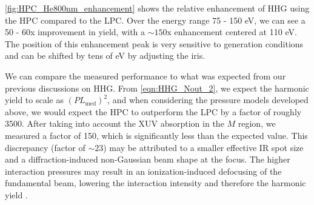 \cref{fig:HPC_He800nm_enhancement} shows the relative enhancement of HHG using the HPC compared to the LPC. Over the energy range 75 - 150 eV, we can see a 50 - 60x improvement in yield, with a $\sim 150 \textrm{x}$ enhancement centered at 110 eV. The position of this enhancement peak is very sensitive to generation conditions and can be shifted by tens of eV by adjusting the iris.

We can compare the measured performance to what was expected from our previous discussions on HHG. From \cref{eqn:HHG_Nout_2}, we expect the harmonic yield to scale as $(PL_{\textrm{med}})^2$, and when considering the pressure models developed above, we would expect the HPC to outperform the LPC by a factor of roughly 3500. After taking into account the XUV absorption in the $M$ region, we measured a factor of 150, which is significantly less than the expected value. This discrepancy (factor of $\sim 23$) may be attributed to a smaller effective IR spot size and a diffraction-induced non-Gaussian beam shape at the focus. The higher interaction pressures may result in an ionization-induced defocusing of the fundamental beam, lowering the interaction intensity and therefore the harmonic yield \cite{altucciInfluenceAtomicDensity1996}.

%



